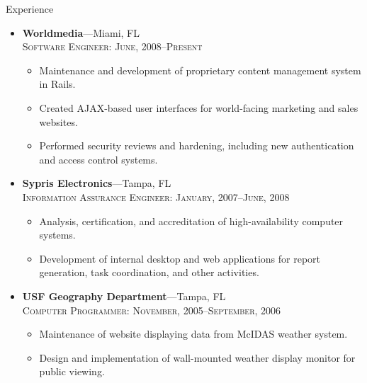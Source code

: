\documentclass[11pt,oneside]{article}
\newenvironment{ressection}[1]{
	\vspace{2pt}
	{\selectfont\Large#1}
	\begin{itemize}
	\vspace{3pt}
}{
	\end{itemize}
}
\newcommand{\ressubitem}[1]{
	\vspace{-1pt}
	\item \begin{flushleft} #1 \end{flushleft}
}
\newcommand{\resbigitem}[3]{
	\vspace{-5pt}
	\item
	\textbf{#1}---#2 \\
	\textsc{#3}
}
\newenvironment{ressubsec}[3]{
	\resbigitem{#1}{#2}{#3}
	\vspace{-2pt}
	\begin{itemize}
}{
	\end{itemize}
}
\begin{document}
\begin{ressection}{Experience}
	\begin{ressubsec}{Worldmedia}{Miami, FL}{Software Engineer: June, 2008--Present}
		\ressubitem{Maintenance and development of proprietary content management system in Rails.}
		\ressubitem{Created AJAX-based user interfaces for world-facing marketing and sales websites.}
		\ressubitem{Performed security reviews and hardening, including new authentication and access control systems.}
	\end{ressubsec}
	
	\begin{ressubsec}{Sypris Electronics}{Tampa, FL}{Information Assurance Engineer: January, 2007--June, 2008}
		\ressubitem{Analysis, certification, and accreditation of high-availability computer systems.}
		\ressubitem{Development of internal desktop and web applications for report generation, task coordination, and other activities.}
	\end{ressubsec}

	\begin{ressubsec}{USF Geography Department}{Tampa, FL}{Computer Programmer: November, 2005--September, 2006}
		\ressubitem{Maintenance of website displaying data from McIDAS weather system.}
		\ressubitem{Design and implementation of wall-mounted weather display monitor for public viewing.}
	\end{ressubsec}

	

\end{ressection}
\end{document}
